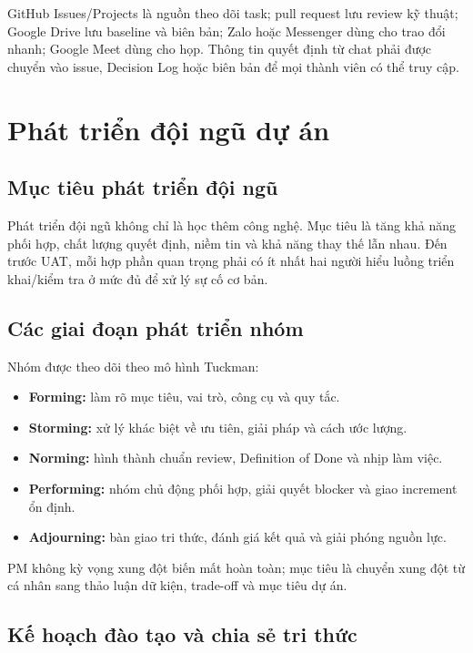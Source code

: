 GitHub Issues/Projects là nguồn theo dõi task; pull request lưu review kỹ thuật; Google Drive lưu baseline và biên bản; Zalo hoặc Messenger dùng cho trao đổi nhanh; Google Meet dùng cho họp. Thông tin quyết định từ chat phải được chuyển vào issue, Decision Log hoặc biên bản để mọi thành viên có thể truy cập.

\section{Phát triển đội ngũ dự án}

\subsection{Mục tiêu phát triển đội ngũ}

Phát triển đội ngũ không chỉ là học thêm công nghệ. Mục tiêu là tăng khả năng phối hợp, chất lượng quyết định, niềm tin và khả năng thay thế lẫn nhau. Đến trước UAT, mỗi hợp phần quan trọng phải có ít nhất hai người hiểu luồng triển khai/kiểm tra ở mức đủ để xử lý sự cố cơ bản.

\subsection{Các giai đoạn phát triển nhóm}

Nhóm được theo dõi theo mô hình Tuckman:

\begin{itemize}
  \item \textbf{Forming:} làm rõ mục tiêu, vai trò, công cụ và quy tắc.
  \item \textbf{Storming:} xử lý khác biệt về ưu tiên, giải pháp và cách ước lượng.
  \item \textbf{Norming:} hình thành chuẩn review, Definition of Done và nhịp làm việc.
  \item \textbf{Performing:} nhóm chủ động phối hợp, giải quyết blocker và giao increment ổn định.
  \item \textbf{Adjourning:} bàn giao tri thức, đánh giá kết quả và giải phóng nguồn lực.
\end{itemize}

PM không kỳ vọng xung đột biến mất hoàn toàn; mục tiêu là chuyển xung đột từ cá nhân sang thảo luận dữ kiện, trade-off và mục tiêu dự án.

\subsection{Kế hoạch đào tạo và chia sẻ tri thức}

